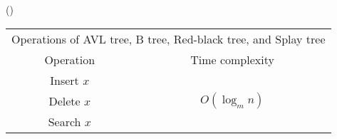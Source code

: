 \item \begin{theorem}{()}
    \begin{table}[H]
        \centering
        \begin{tabular}{|c|c|}
            \hline
            \multicolumn{2}{|c|}{Operations of AVL tree, B tree, Red-black tree, and Splay tree} \\
            \Xhline{3\arrayrulewidth}
            Operation & Time complexity \\
            \Xhline{2\arrayrulewidth}
            Insert $x$ & \multirow{3}{*}{$O(\log_m n)$} \\
            \cline{1-1}
            Delete $x$ & \\
            \cline{1-1}
            Search $x$ & \\
            \hline
        \end{tabular}
    \end{table}
\end{theorem}

